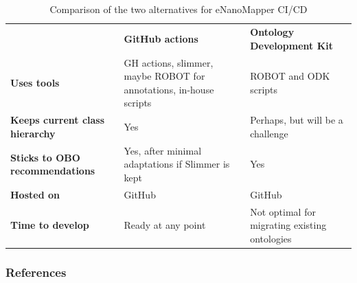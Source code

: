 \documentclass[english, xcolor=dvipsnames, aspectratio=169]{beamer}
\newcommand{\subsectiontitle}{}
\begin{document}
\subsection{\subsectiontitle}
\begin{frame}{\subsectiontitle}
\begin{table}[ht]
\caption{Comparison of the two alternatives for eNanoMapper CI/CD}
\label{tab:Comparing-approaches}
  \begin{adjustbox}{width=\textwidth}


\begin{tabular}{lll}
                                                                                  & \textbf{GitHub actions}                                            & \textbf{Ontology Development Kit}             \\
\textbf{Uses tools}                                                               & GH actions, slimmer, maybe ROBOT for annotations, in-house scripts & ROBOT and ODK scripts                         \\
\textbf{Keeps current class hierarchy}                                            & Yes                                                                & Perhaps, but will be a challenge              \\
\textbf{Sticks to OBO recommendations} & Yes, after minimal adaptations if Slimmer is kept                                    & Yes                                           \\
\textbf{Hosted on}                                                                & GitHub                                                             & GitHub                                        \\
\textbf{Time to develop}                                                          & Ready at any point                                                 & Not optimal for migrating existing ontologies \cite{matentzoglu_ontology_2021}
\end{tabular}
  \end{adjustbox}
\end{table}
\end{frame}

\begin{frame}[t, allowframebreaks]
\frametitle{References}


\end{frame}
\end{document}
